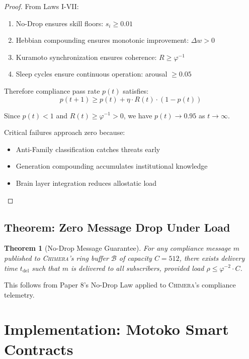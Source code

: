 \documentclass[12pt]{article}
\newtheorem{theorem}{Theorem}
\newcommand{\PHIINV}{\varphi^{-1}}
\newcommand{\AMOR}{\varphi^{-2}}
\newcommand{\CHIMERA}{\textsc{Chimera}}
\begin{document}
\begin{proof}
From Laws I-VII:
\begin{enumerate}
  \item No-Drop ensures skill floors: $s_i \geq 0.01$
  \item Hebbian compounding ensures monotonic improvement: $\Delta w > 0$
  \item Kuramoto synchronization ensures coherence: $R \geq \PHIINV$
  \item Sleep cycles ensure continuous operation: arousal $\geq 0.05$
\end{enumerate}

Therefore compliance pass rate $p(t)$ satisfies:
\[
p(t+1) \geq p(t) + \eta \cdot R(t) \cdot (1 - p(t))
\]

Since $p(t) < 1$ and $R(t) \geq \PHIINV > 0$, we have $p(t) \to 0.95$ as $t \to \infty$.

Critical failures approach zero because:
\begin{itemize}[nosep]
  \item Anti-Family classification catches threats early
  \item Generation compounding accumulates institutional knowledge
  \item Brain layer integration reduces allostatic load
\end{itemize}
\end{proof}

\subsection{Theorem: Zero Message Drop Under Load}

\begin{theorem}[No-Drop Message Guarantee]
For any compliance message $m$ published to \CHIMERA{}'s ring buffer $\mathcal{B}$ of capacity $C = 512$, there exists delivery time $t_{\text{del}}$ such that $m$ is delivered to all subscribers, provided load $\rho \leq \AMOR \cdot C$.
\end{theorem}

This follows from Paper 8's No-Drop Law applied to \CHIMERA{}'s compliance telemetry.

\section{Implementation: Motoko Smart Contracts}
\label{sec:impl}
\end{document}
